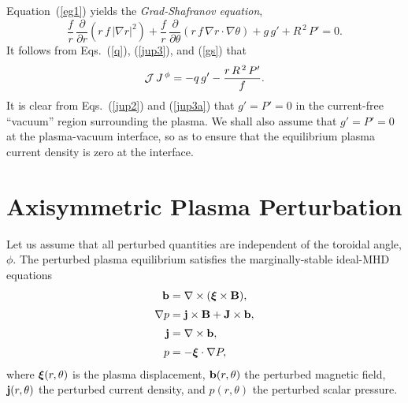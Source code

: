\documentclass[12pt,prb,aps,notitlepage]{revtex4-1}
\newcommand {\bxi}{\mbox{\boldmath$\xi$}}
\begin{document}
Equation~(\ref{eg1}) yields the {\em Grad-Shafranov equation},
\begin{equation}\label{gs}
\frac{f}{r}\,\frac{\partial}{\partial r}\!\left(r\,f\,|\nabla r|^2\right) +\frac{f}{r}\,\frac{\partial}{\partial\theta}\!\left(r\,f\,\nabla r\cdot\nabla\theta\right)+g\,g' + R^{\,2}\,P'=0.
\end{equation}
It follows from Eqs.~(\ref{q}), (\ref{jup3}), and (\ref{gs}) that
\begin{equation}\label{jup3a}
{\cal J}\,J^{\,\phi} = -q\,g' - \frac{r\,R^{\,2}\,P'}{f}.
\end{equation}
It is clear from Eqs.~(\ref{jup2}) and (\ref{jup3a}) that $g'=P'=0$ in the  current-free ``vacuum'' region surrounding the plasma.
We shall also assume that $g'=P'=0$ at the plasma-vacuum interface, so as to ensure that the equilibrium plasma
current density is zero at the interface. 

\section{Axisymmetric Plasma Perturbation}\label{opde}
Let us assume that all perturbed quantities are independent of the toroidal angle, $\phi$. 
The perturbed plasma equilibrium satisfies the  marginally-stable ideal-MHD equations
\begin{align}
{\bf b} &= \nabla\times (\bxi\times {\bf B}),\label{e21}\\[0.5ex]
\nabla p &={\bf j}\times {\bf B}  +{\bf J}\times {\bf b},\label{e22}\\[0.5ex]
{\bf j} &= \nabla\times {\bf b},\label{e23}\\[0.5ex]
p&= -\bxi\cdot\nabla P,\label{e24}
\end{align}
where $\bxi(r,\theta)$ is the plasma displacement, ${\bf b}(r,\theta)$ the perturbed magnetic field,
${\bf j}(r,\theta)$ the perturbed current density, and $p(r,\theta)$ the perturbed scalar pressure. 
\end{document}
